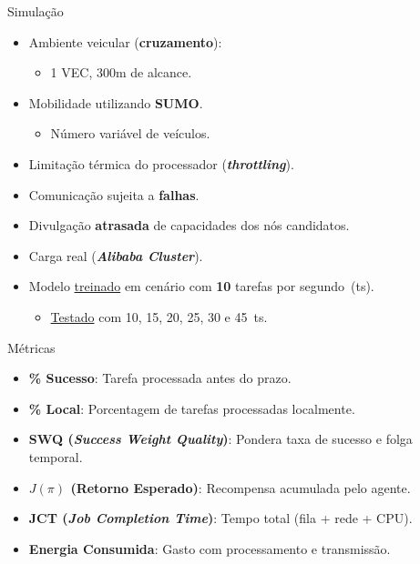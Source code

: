 \documentclass[aspectratio=169]{beamer}
\begin{document}
\begin{frame}{Simulação}
    \begin{itemize}
        \item Ambiente veicular (\textbf{cruzamento}):
        \begin{itemize}
            \item 1 VEC, 300m de alcance.
        \end{itemize}
        \item Mobilidade utilizando \textbf{SUMO}.
        \begin{itemize}
            \item Número variável de veículos.
        \end{itemize}
        \item Limitação térmica do processador (\textbf{\textit{throttling}}).
        \item Comunicação sujeita a \textbf{falhas}.
        \item Divulgação \textbf{atrasada} de capacidades dos nós candidatos.
        \item Carga real (\textbf{\textit{Alibaba Cluster}}).
        \item Modelo \underline{treinado} em cenário com \textbf{10} tarefas por segundo~(ts).
        \begin{itemize}
            \item \underline{Testado} com 10, 15, 20, 25, 30 e 45~ts.
        \end{itemize}
    \end{itemize}
\end{frame}

\begin{frame}{Métricas}
    \begin{itemize}
        \item \textbf{\% Sucesso}: Tarefa processada antes do prazo.
        \item \textbf{\% Local}: Porcentagem de tarefas processadas localmente.
        \item \textbf{SWQ (\textit{Success Weight Quality})}: Pondera taxa de sucesso e folga temporal.
        \item \textbf{$J(\pi)$ (Retorno Esperado)}: Recompensa acumulada pelo agente.
        \item \textbf{JCT (\textit{Job Completion Time})}: Tempo total (fila + rede + CPU).
        \item \textbf{Energia Consumida}: Gasto com processamento e transmissão.
    \end{itemize}
\end{frame}
\end{document}
